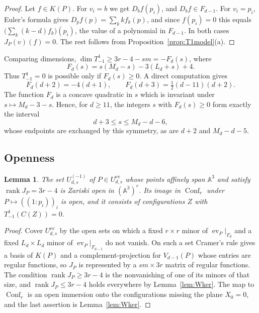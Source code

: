 \documentclass{amsart}
\newtheorem{lemma}[theorem]{Lemma}
\theoremstyle{definition}
\theoremstyle{remark}
\numberwithin{equation}{section}
\newcommand{\A}{\mathbb{A}}
\DeclareMathOperator{\ev}{ev}
\DeclareMathOperator{\rank}{rank}
\begin{document}
\begin{proof}
Let $f\in K(P)$. For $v_i=b$ we get $D_bf(p_i)$, and $D_bf\in F_{d-1}$. For
$v_i=p_i$, Euler's formula gives $D_{p}f(p)=\sum_kkf_k(p)$, and since
$f(p_i)=0$ this equals $\bigl(\sum_k(k-d)f_k\bigr)(p_i)$, the value of a polynomial
in $F_{d-1}$. In both cases $J_P(v)(f)=0$. The rest follows from
Proposition~\ref{prop:T1model}(a).
\end{proof}

Comparing dimensions, $\dim T^1_{-1}\ge 3r-4-sm=-F_d(s)$, where
\begin{equation}\label{eq:F}
  F_d(s)=s(M_d-s)-3(L_d+s)+4 .
\end{equation}
Thus $T^1_{-1}=0$ is possible only if $F_d(s)\ge0$. A direct computation gives
\begin{equation}\label{eq:Fvalues}
  F_d(d+2)=-4(d+1),\qquad F_d(d+3)=\tfrac12(d-11)(d+2).
\end{equation}
The function $F_d$ is a concave quadratic in $s$ which is invariant under
$s\mapsto M_d-3-s$. Hence, for $d\ge11$, the integers $s$ with $F_d(s)\ge0$ form
exactly the interval
\begin{equation}\label{eq:window}
  d+3\le s\le M_d-d-6,
\end{equation}
whose endpoints are exchanged by this symmetry, as are $d+2$ and $M_d-d-5$.

\subsection{Openness}
\begin{lemma}\label{lem:open}
The set $U^{(-1)}_{d,s}$ of $P\in U^{\mathrm{ev}}_{d,s}$ whose points affinely span
$\A^3$ and satisfy $\rank J_P=3r-4$ is Zariski open in $(\A^3)^r$. Its image in
$\operatorname{Conf}_r$ under $P\mapsto((1:p_i))_i$ is open, and it consists of
configurations $Z$ with $T^1_{-1}(C(Z))=0$.
\end{lemma}

\begin{proof}
Cover $U^{\mathrm{ev}}_{d,s}$ by the open sets on which a fixed $r\times r$ minor of
$\ev_P|_{F_d}$ and a fixed $L_d\times L_d$ minor of $\ev_P|_{F_{d-1}}$ do not vanish.
On such a set Cramer's rule gives a basis of $K(P)$ and a complement-projection for
$V_{d-1}(P)$ whose entries are regular functions, so $J_P$ is represented by a
$sm\times 3r$ matrix of regular functions. The condition $\rank J_P\ge3r-4$ is the
nonvanishing of one of its minors of that size, and $\rank J_P\le3r-4$ holds
everywhere by Lemma~\ref{lem:Wker}. The map to $\operatorname{Conf}_r$ is an open
immersion onto the configurations missing the plane $X_0=0$, and the last assertion
is Lemma~\ref{lem:Wker}.
\end{proof}
\end{document}
